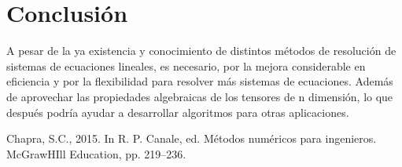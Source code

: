 \documentclass[12pt,oneside,FLEQN]{report}
\begin{document}
{\chapter{Conclusión}
A pesar de la ya existencia y conocimiento de distintos métodos de resolución de sistemas de ecuaciones lineales, es necesario, por la mejora considerable en eficiencia y por la flexibilidad para resolver más sistemas de ecuaciones. Además de aprovechar las propiedades algebraicas de los tensores de n dimensión, lo que después podría ayudar a desarrollar algoritmos para otras aplicaciones.
\begin{thebibliography}{1}
	 Chapra, S.C., 2015. In R. P. Canale, ed. Métodos numéricos para ingenieros. McGrawHIll Education, pp. 219–236. 
\end{thebibliography}
}
\end{document}
